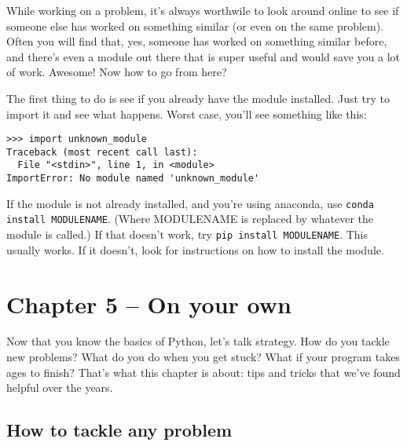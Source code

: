 \documentclass[12pt]{book}
\begin{document}
While working on a problem, it's always worthwile to look around online to see if someone else has worked on something similar (or even on the same problem). Often you will find that, yes, someone has worked on something similar before, and there's even a module out there that is super useful and would save you a lot of work. Awesome!
Now how to go from here?

The first thing to do is see if you already have the module installed. Just try to import it and see what happens. Worst case, you'll see something like this:

\begin{lstlisting}
>>> import unknown_module
Traceback (most recent call last):
  File "<stdin>", line 1, in <module>
ImportError: No module named 'unknown_module'
\end{lstlisting}

If the module is not already installed, and you're using anaconda, use \texttt{conda install MODULENAME}.
(Where MODULENAME is replaced by whatever the module is called.) If that doesn't work, try \texttt{pip install MODULENAME}. This usually works. If it doesn't, look for instructions on how to install the module.

\chapter{Chapter 5 -- On your own}

Now that you know the basics of Python, let's talk strategy. How do you
tackle new problems? What do you do when you get stuck? What if your
program takes ages to finish? That's what this chapter is about: tips
and tricks that we've found helpful over the years.

\section{How to tackle any problem}
\end{document}
